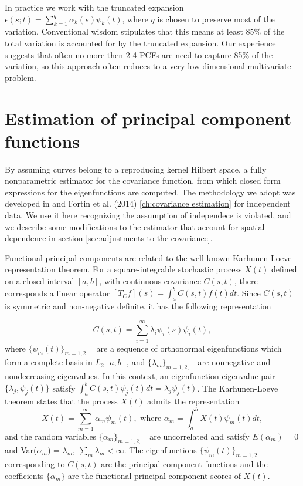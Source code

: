 In practice we work with the truncated expansion $\epsilon(s;t) = \sum_{k=1}^{q} \alpha_k(s)\psi_k(t)$, where $q$ is chosen to preserve most of the variation. Conventional wisdom stipulates that this means at least 85\% of the total variation is accounted for by the truncated expansion. Our experience suggests that often no more then 2-4 PCFs are need to capture 85\% of the variation, so this approach often reduces to a very low dimensional multivariate problem. 



\section{Estimation of principal component functions} 

\label{sec:eigenfunction_estimation} By assuming curves belong to a reproducing kernel Hilbert space, a fully nonparametric estimator for the covariance function, from which closed form expressions for the eigenfunctions are computed. The methodology we adopt was developed in \cite{Cai:2010vr} and Fortin et al. (2014) \ref{ch:covariance estimation} for independent data. We use it here recognizing the assumption of independece is violated, and we describe some modifications to the estimator that account for spatial dependence in section \ref{sec:adjustments to the covariance}.

Functional principal components are related to the well-known Karhunen-Loeve representation theorem. For a square-integrable stochastic process $X(t)$ defined on a closed interval $[a,b]$, with continuous covariance $C(s,t)$, there corresponds a linear operator $[T_Cf](s) = \int_a^bC(s,t)f(t)dt$. Since $C(s,t)$ is symmetric and non-negative definite, it has the following representation 

\begin{equation*}
	C(s,t) = \sum_{i=1}^{\infty}\lambda_i\psi_i(s)\psi_i(t), 
\end{equation*}
where $\{\psi_m(t)\}_{m=1,2,\ldots}$ are a sequence of orthonormal eigenfunctions which form a complete basis in $L_2[a,b]$, and $\{\lambda_m \}_{m=1,2,\ldots}$ are nonnegative and nondecreasing eigenvalues. In this context, an eigenfunction-eigenvalue pair $\{\lambda_j, \psi_j(t)\}$ satisfy $\int_a^bC(s,t)\psi_j(t)dt = \lambda_j\psi_j(t)$. The Karhunen-Loeve theorem states that the process $X(t)$ admits the representation 
\begin{equation*}
	X(t) = \sum_{m=1}^{\infty}\alpha_m \psi_m(t), \mbox{ where } \alpha_m = \int_a^b X(t) \psi_m(t)dt, 
\end{equation*}
and the random variables $\{\alpha_m \}_{m=1,2,\ldots}$ are uncorrelated and satisfy $E(\alpha_m)=0$ and Var($\alpha_m$) = $\lambda_m$, $\sum_m \lambda_m < \infty$. The eigenfunctions $\{\psi_m(t)\}_{m=1,2,\ldots}$ corresponding to $C(s,t)$ are the principal component functions and the coefficients $\{\alpha_m \}$ are the functional principal component scores of $X(t)$.

